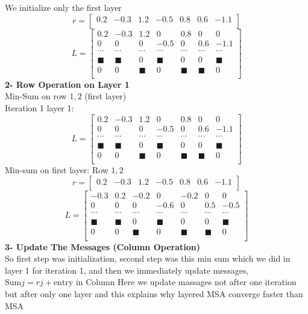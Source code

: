 We initialize only the first layer
\[  r=[\begin{matrix}0.2&-0.3&1.2&-0.5&0.8&0.6&-1.1\\\end{matrix}] \]
\[ L=\left[\begin{matrix}0.2&-0.3&1.2&0&0.8&0&0\\0&0&0&-0.5&0&0.6&-1.1\\\cdots&\cdots&\cdots&\cdots&\cdots&\cdots&\cdots\\\blacksquare&\blacksquare&0&\blacksquare&0&0&\blacksquare\\0&0&\blacksquare&0&\blacksquare&\blacksquare&0\\\end{matrix}\right] \]
\textbf{2- Row Operation on Layer 1}\\
Min-Sum on row $1,2$ (first layer)\\
Iteration 1 layer 1:\\
\[ L=\left[\begin{matrix}0.2&-0.3&1.2&0&0.8&0&0\\0&0&0&-0.5&0&0.6&-1.1\\\cdots&\cdots&\cdots&\cdots&\cdots&\cdots&\cdots\\\blacksquare&\blacksquare&0&\blacksquare&0&0&\blacksquare\\0&0&\blacksquare&0&\blacksquare&\blacksquare&0\\\end{matrix}\right] \]
Min-sum on first layer: Row $1, 2$\\
\[ r=[\begin{matrix}0.2&-0.3&1.2&-0.5&0.8&0.6&-1.1\\\end{matrix}] \]
\[ L=\left[\begin{matrix}-0.3&0.2&-0.2&0&-0.2&0&0\\0&0&0&-0.6&0&0.5&-0.5\\\cdots&\cdots&\cdots&\cdots&\cdots&\cdots&\cdots\\\blacksquare&\blacksquare&0&\blacksquare&0&0&\blacksquare\\0&0&\blacksquare&0&\blacksquare&\blacksquare&0\\\end{matrix}\right] \]
\textbf{3- Update The Messages (Column Operation)}\\
So first step was initialization, second step was this min sum which we did in layer 1 for iteration 1, and then we immediately update messages,
$\text{Sum} j = r j + \text{entry in Column}$
Here we update massages not after one iteration but after only one layer and this explains why layered MSA  converge faster than MSA
